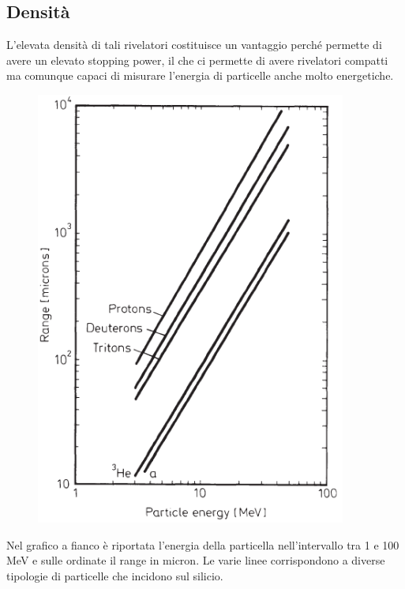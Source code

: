 \vspace{-0.15cm}

\subsection{Densità}
L'elevata densità di tali rivelatori costituisce un vantaggio perché permette di avere un elevato stopping power, il che ci permette di avere rivelatori compatti ma comunque capaci di misurare l'energia di particelle anche molto energetiche.

\begin{esempio}
   \begin{minipage}{0.36\textwidth}
      \begin{figure}[H]
         \centering
         \includegraphics[width=0.91\textwidth]{immagini/range_particelle_in_semiconduttori.png}
      \end{figure}
   \end{minipage}
   \begin{minipage}{0.63\textwidth}
      Nel grafico a fianco è riportata l'energia della particella nell'intervallo tra 1 e 100 MeV e sulle ordinate il range in micron. Le varie linee corrispondono a diverse tipologie di particelle che incidono sul silicio.


\end{minipage}
\end{esempio}
